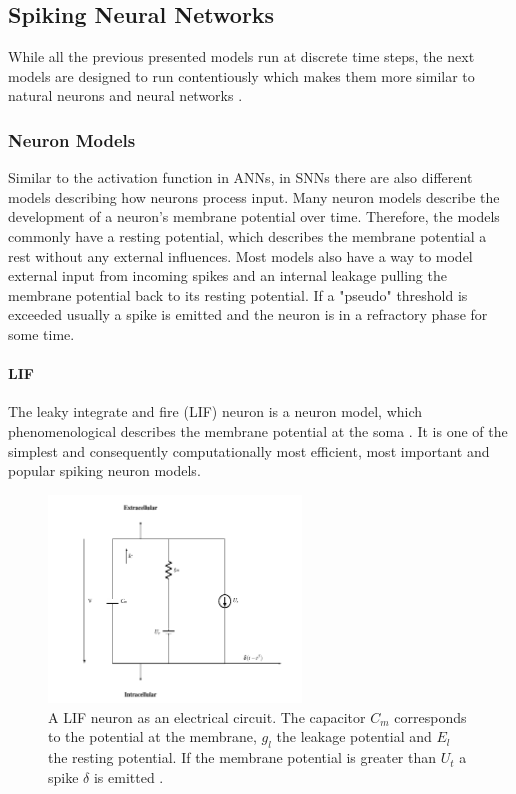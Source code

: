 \subsection{Spiking Neural Networks} \label{c:snns}

While all the previous presented models run at discrete time steps, the next models are designed to run contentiously which makes them more similar to natural neurons and neural networks \cite{maass1997networks}. 

\subsubsection{Neuron Models} \label{c:snnneurons}

Similar to the activation function in ANNs, in SNNs there are also different models describing how neurons process input.
Many neuron models describe the development of a neuron's membrane potential over time.
Therefore, the models commonly have a resting potential, which describes the membrane potential a rest without any external influences. 
Most models also have a way to model external input from incoming spikes and an internal leakage pulling the membrane potential back to its resting potential. 
If a "pseudo" threshold is exceeded usually a spike is emitted and the neuron is in a refractory phase for some time.

\paragraph{LIF} \label{c:lif}

The leaky integrate and fire (LIF) neuron is a neuron model, which phenomenological describes the membrane potential at the soma \cite{abbott1999lapicque}\cite{gerstner2014neuronal}\cite{Petrovici2016}. 
It is one of the simplest and consequently computationally most efficient, most important and popular spiking neuron models.  

\begin{figure}
	\centering
    	\includegraphics[width=0.6\textwidth]{imgs/lif.png} 
    \caption[A LIF neuron as an electrical circuit.]{A LIF neuron as an electrical circuit. The capacitor $C_m$ corresponds to the potential at the membrane, $g_l$ the leakage potential and $E_l$ the resting potential. If the membrane potential is greater than $U_t$ a spike $\delta$ is emitted \cite{heikoMA}.}
	\label{fig:lif}
\end{figure}

